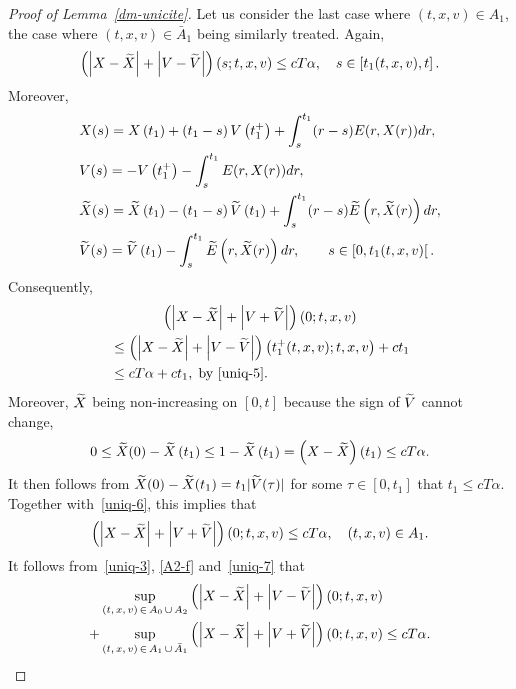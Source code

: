\documentclass[AHL,Unicode,longabstracts,published]{cedram}
\let\oldtilde\tilde
\renewcommand*{\tilde}[1]{\mathchoice{\widetilde{#1}}{\widetilde{#1}}{\oldtilde{#1}}{\oldtilde{#1}}}
\begin{document}
\begin{proof}[{Proof of Lemma~\ref{dm-unicite}}]
Let us consider the last case where $(t,x,v)\in A_1$, the case where $(t,x,v)\in \bar{A}_1$ being similarly treated. Again,
\begin{equation}\label{uniq-5}
\left (\left|X-\tilde{X}\right|+\left|V-\tilde{V}\right| \right) (s;t,x,v) \leq cT\alpha, \quad s \in \left[t_1(t,x,v),t\right].
\end{equation}
Moreover,
\begin{align*}
&X(s)= X\left(t_1\right)+ \left(t_1-s\right)V\left(t_1^+\right)+\int_s^{t_1} (r-s)E(r,X(r)) dr, \\
& V(s)= -V\left(t_1^+\right)-\int_s^{t_1} E(r,X(r)) dr, \\
&\tilde{X}(s)= \tilde{X}\left(t_1\right)-\left(t_1-s\right)\tilde{V}\left(t_1\right)+\int_s^{t_1} (r-s)\tilde{E}\left(r,\tilde{X}(r)\right) dr, \\
&\tilde{V}(s)= \tilde{V}\left(t_1\right)-\int_s^{t_1} \tilde{E}\left(r,\tilde{X}(r)\right) dr,\qquad s\in \left[0,t_1(t,x,v)\right[.
\end{align*}
Consequently,
\begin{multline}\label{uniq-6}
\left (\left|X-\tilde{X}\right|+\left|V+\tilde{V}\right| \right)(0;t,x,v)\\
\begin{aligned}
&\leq \left(\left|X-\tilde{X}\right|+\left|V-\tilde{V}\right| \right)\left(t_1^+(t,x,v); t,x,v\right)+ct_1\\
&\leq cT\alpha +ct_1,\; \text{by }\eqref{uniq-5}.
\end{aligned}
\end{multline}
Moreover, $\tilde{X}$ being non-increasing on $[0,t]$ because the sign of $\tilde{V}$ cannot change,
\[
0 \leq \tilde{X}(0)-\tilde{X}\left(t_1\right)\leq 1-\tilde{X}\left(t_1\right)=\left(X-\tilde{X}\right)\left(t_1\right) \leq cT\alpha.
\]
It then follows from $\tilde{X}(0)-\tilde{X}(t_1)= t_1 |\tilde{V}(\tau)|$ for some $\tau \in [0,t_1]$ that $t_1\leq cT\alpha $. Together with~\eqref{uniq-6}, this implies that
\begin{equation}\label{uniq-7}
\left (\left|X-\tilde{X}\right|+\left|V+\tilde{V}\right| \right)(0;t,x,v) \leq cT\alpha, \quad (t,x,v)\in A_1.
\end{equation}
It follows from~\eqref{uniq-3}, \eqref{A2-f} and~\eqref{uniq-7} that
\begin{align*}
&\sup_{(t,\,x,\,v)\,\in\,A_0\,\cup\,A_2} \left(\left|X-\tilde{X}\right|+\left|V-\tilde{V}\right|\right)(0;t,x,v) \\
+ &\sup_{(t,\,x,\,v)\,\in\,A_1\,\cup\,\bar{A}_1} \left(\left|X-\tilde{X}\right|+\left|V+\tilde{V}\right|\right)(0;t,x,v) \leq cT\alpha.

\end{align*}
\end{proof}
\end{document}
